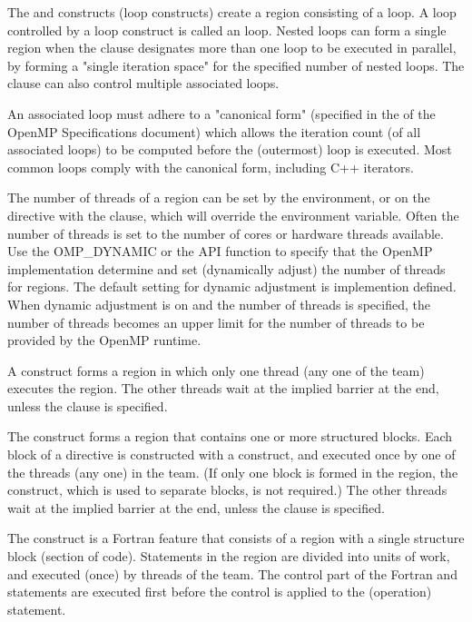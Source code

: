 
The  and  constructs (loop constructs) create a region 
consisting of a loop.  A loop controlled by a loop construct is called 
an  loop.  Nested loops can form a single region when the 
 clause designates more than one  loop
to be executed in parallel, by forming a "single iteration space" for 
the specified number of nested loops.  The  clause can 
also control multiple associated loops.

An associated loop must adhere to a "canonical form" (specified in the 
 of the OpenMP Specifications document) which allows the 
iteration count (of all associated loops) to be computed before the 
(outermost) loop is executed. %
Most common loops comply with the canonical form, including C++ iterators.

The number of threads of a  region can be set by the 
environment, or on the  directive with the 
clause, which will override the environment variable. Often the number of threads
is set to the number of cores or hardware threads available.  Use the OMP\_DYNAMIC
or the  API function to specify that the OpenMP 
implementation determine and set (dynamically adjust) the number of threads for 
 regions.  The default setting for dynamic adjustment is implemention 
defined. When dynamic adjustment is on and the number of threads is specified,
the number of threads becomes an upper limit for the number of threads to be
provided by the OpenMP runtime.

A  construct forms a region in which only one thread (any one 
of the team) executes the region. 
The other threads wait at the implied 
barrier at the end, unless the  clause is specified.

The  construct forms a region that contains one or more 
structured blocks.  Each block of a  directive is 
constructed with a  construct, and executed once by 
one of the threads (any one) in the team.  (If only one block is 
formed in the region, the  construct, which is used to
separate blocks, is not required.)
The other threads wait at the implied 
barrier at the end, unless the  clause is specified.


The  construct is a Fortran feature that consists of a
region with a single structure block (section of code). Statements in the
 region are divided into units of work, and executed (once)
by threads of the team.  The control part of the Fortran  and 
 statements are executed first before the control is applied 
to the (operation) statement.

